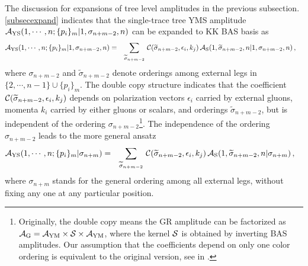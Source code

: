\documentclass[preprint,showpacs,onecolumn,nofootinbib]{revtex4}
\newcommand{\bea}{\begin{eqnarray}}
\newcommand{\eea}{\end{eqnarray}}
\def\W #1{\widetilde{#1}}
\begin{document}
The discussion for expansions of tree level amplitudes in the previous subsection.\ref{subsecexpand} indicates that the single-trace tree YMS amplitude ${\cal A}_{\rm YS}(1,\cdots,n;\{p_i\}_m|1,\sigma_{n+m-2},n)$ can be expanded to KK BAS basis as
%
\bea
{\cal A}_{\rm YS}(1,\cdots,n;\{p_i\}_m|1,\sigma_{n+m-2},n)
&=&\sum_{\W\sigma_{n+m-2}}\,{\cal C}(\W\sigma_{n+m-2},\epsilon_i,k_j)\,{\cal A}_{\rm S}(1,\W\sigma_{n+m-2},n|1,\sigma_{n+m-2},n)\,,~~~\label{exp-YMS-KK}
\eea
%
where $\sigma_{n+m-2}$ and $\W\sigma_{n+m-2}$ denote orderings among external legs in $\{2,\cdots,n-1\}\cup\{p_i\}_m$. The double copy structure \cite{Kawai:1985xq,Bern:2008qj,Chiodaroli:2014xia,Johansson:2015oia,Johansson:2019dnu,Cachazo:2013iea} indicates that the coefficient ${\cal C}(\W\sigma_{n+m-2},\epsilon_i,k_j)$ depends on polarization vectors $\epsilon_i$ carried by external gluons,
momenta $k_i$ carried by either gluons or scalars, and orderings $\W\sigma_{n+m-2}$, but is independent of the ordering $\sigma_{n+m-2}$\footnote{Originally, the double copy means the GR amplitude can be factorized as ${\cal A}_{\rm G}={\cal A}_{\rm YM}\times {\cal S}\times{\cal A}_{\rm YM}$, where the kernel ${\cal S}$ is obtained by inverting BAS amplitudes. Our assumption that the coefficients depend on only one color ordering is equivalent to the original version, see in \cite{Zhou:2022orv}.}. The independence of the ordering $\sigma_{n+m-2}$ leads to the more general ansatz
%
\bea
{\cal A}_{\rm YS}(1,\cdots,n;\{p_i\}_m|\sigma_{n+m})
&=&\sum_{\W\sigma_{n+m-2}}\,{\cal C}(\W\sigma_{n+m-2},\epsilon_i,k_j)\,{\cal A}_{\rm S}(1,\W\sigma_{n+m-2},n|\sigma_{n+m})\,,~~~\label{exp-YS-KK}
\eea
%
where $\sigma_{n+m}$ stands for the general ordering among all external legs, without fixing any one at any particular position.
\end{document}
